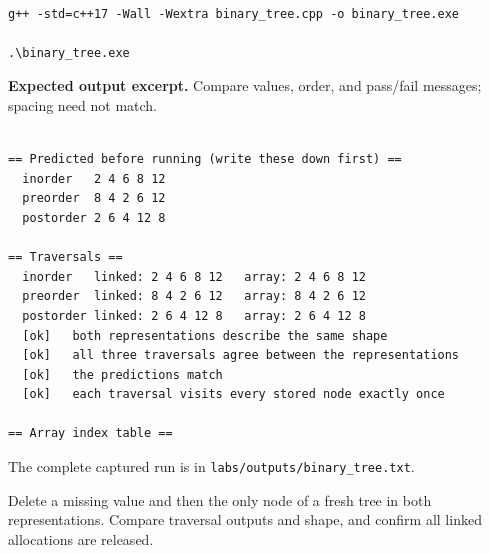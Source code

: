\begin{lstlisting}[style=utpterminal,language={}]

g++ -std=c++17 -Wall -Wextra binary_tree.cpp -o binary_tree.exe

.\binary_tree.exe

\end{lstlisting}

\textbf{Expected output excerpt.} Compare values, order, and pass/fail messages; spacing need not match.

\begin{lstlisting}[style=utpterminal,language={}]

== Predicted before running (write these down first) ==
  inorder   2 4 6 8 12
  preorder  8 4 2 6 12
  postorder 2 6 4 12 8

== Traversals ==
  inorder   linked: 2 4 6 8 12   array: 2 4 6 8 12 
  preorder  linked: 8 4 2 6 12   array: 8 4 2 6 12 
  postorder linked: 2 6 4 12 8   array: 2 6 4 12 8 
  [ok]   both representations describe the same shape
  [ok]   all three traversals agree between the representations
  [ok]   the predictions match
  [ok]   each traversal visits every stored node exactly once

== Array index table ==

\end{lstlisting}

The complete captured run is in \texttt{labs/outputs/binary\_tree.txt}.

\begin{tryit}

Delete a missing value and then the only node of a fresh tree in both representations. Compare traversal outputs and shape, and confirm all linked allocations are released.

\end{tryit}
